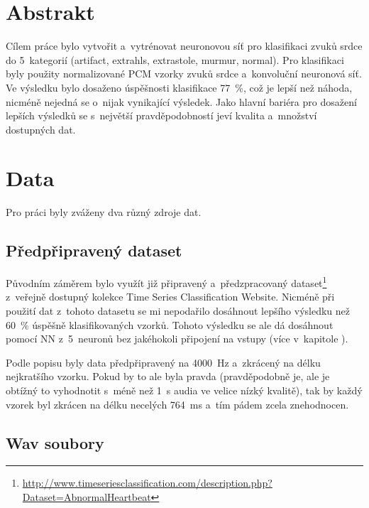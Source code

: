 \documentclass[\languages,a4paper,12pt]{article}
\title{\documenttitle}
\date{\documentdate}
\author{\documentauthor}
\begin{document}
\maketitle

\section{Abstrakt}

Cílem práce bylo vytvořit a vytrénovat neuronovou síť pro klasifikaci zvuků srdce do \num{5} kategorií (artifact, extrahls, extrastole, murmur, normal).
Pro klasifikaci byly použity normalizované PCM vzorky zvuků srdce a konvoluční neuronová síť.
Ve výsledku bylo dosaženo úspěšnosti klasifikace \SI{77}{\percent}, což je lepší než náhoda, nicméně nejedná se o nijak vynikající výsledek.
Jako hlavní bariéra pro dosažení lepších výsledků se s největší pravděpodobností jeví kvalita a množství dostupných dat.

\section{Data}

Pro práci byly zváženy dva různý zdroje dat.

\subsection{Předpřipravený dataset}\label{puvodni-dataset}

Původním záměrem bylo využít již připravený a předzpracovaný dataset\footnote{\url{http://www.timeseriesclassification.com/description.php?Dataset=AbnormalHeartbeat}} z veřejně dostupný kolekce Time Series Classification Website.
Nicméně při použití dat z tohoto datasetu se mi nepodařilo dosáhnout lepšího výsledku než \SI{60}{\percent} úspěšně klasifikovaných vzorků.
Tohoto výsledku se ale dá dosáhnout pomocí NN z 5 neuronů bez jakéhokoli připojení na vstupy (více v kapitole ).

Podle popisu byly data předpřipravený na \SI{4000}{\Hz} a zkrácený na délku nejkratšího vzorku.
Pokud by to ale byla pravda (pravděpodobně je, ale je obtížný to vyhodnotit s méně než \SI{1}{\s} audia ve velice nízký kvalitě), tak by každý vzorek byl zkrácen na délku necelých \SI{764}{\ms} a tím pádem zcela znehodnocen.

\subsection{Wav soubory}
\end{document}
